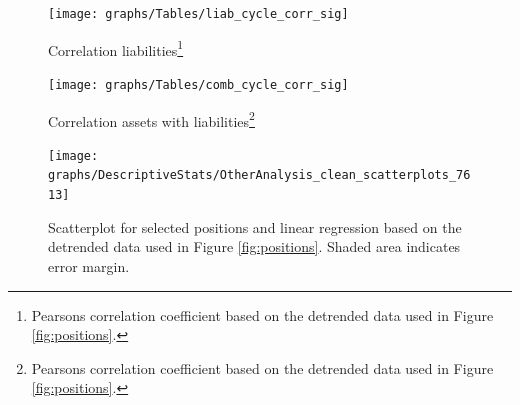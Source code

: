 \documentclass[12pt, a4paper]{article} %
\begin{document}
\begin{figure}[H]
\begin{minipage}{\textwidth}
\centering
\caption[1]{Correlation liabilities\footnote{Pearsons correlation coefficient based on the detrended data used in Figure \ref{fig:positions}.} }
\texttt{[image: graphs/Tables/liab\_cycle\_corr\_sig]}
\label{fig:corr_liab}
\end{minipage}
\end{figure}

\begin{figure}[H]
\begin{minipage}{\textwidth}
\centering
\caption[1]{Correlation assets with liabilities\footnote{Pearsons correlation coefficient based on the detrended data used in Figure \ref{fig:positions}.} }
\texttt{[image: graphs/Tables/comb\_cycle\_corr\_sig]}
\label{fig:corr_comb}
\end{minipage}
\end{figure}
\fi

\begin{figure}[H]
\begin{minipage}{\textwidth}
\centering
\texttt{[image: graphs/DescriptiveStats/OtherAnalysis\_clean\_scatterplots\_7613]}
\caption[1]{Scatterplot for selected positions and linear regression based on the detrended data used in Figure \ref{fig:positions}. Shaded area indicates error margin.}
\label{fig:scatterplots}
\end{minipage}
\end{figure}
\end{document}

